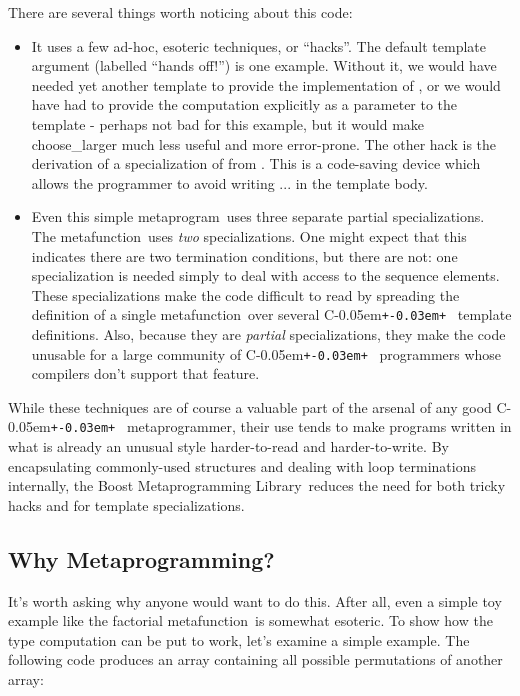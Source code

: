 \documentclass{kapproc}
\newcommand{\Cpp}{C\kern-0.05em\texttt{+\kern-0.03em+}%
}
\newcommand{\Mpl}{Boost Meta\-pro\-gram\-ming Library}
\newcommand{\mpgm}{meta\-pro\-gram}
\newcommand{\mpgmer}{meta\-pro\-gram\-mer}
\newcommand{\mfn}{meta\-func\-tion}
\begin{document}
There are several things worth noticing about this code:

\begin{itemize}
\item It uses a few ad-hoc, esoteric techniques, or ``hacks''. The
  default template argument  (labelled ``hands off!'')
  is one example. Without it, we would have needed yet another
  template to provide the implementation of ,
  or we would have had to provide the computation explicitly as a
  parameter to the template - perhaps not bad for this example, but it
  would make choose\_\-larger much less useful and more
  error-prone. The other hack is the derivation of a specialization of
   from . This is a code-saving
  device which allows the programmer to avoid writing ... in the template body.

\item Even this simple \mpgm\ uses three separate partial
  specializations. The  \mfn\ uses \emph{two}
  specializations. One might expect that this indicates there are two
  termination conditions, but there are not: one specialization is
  needed simply to deal with access to the sequence elements. These
  specializations make the code difficult to read by spreading the
  definition of a single \mfn\ over several \Cpp\ template
  definitions. Also, because they are \emph{partial} specializations,
  they make the code unusable for a large community of \Cpp\
  programmers whose compilers don't support that feature.
\end{itemize}

While these techniques are of course a valuable part of the arsenal of
any good \Cpp\ \mpgmer, their use tends to make programs written in
what is already an unusual style harder-to-read and
harder-to-write. By encapsulating commonly-used structures and dealing
with loop terminations internally, the \Mpl\ reduces the need for both
tricky hacks and for template specializations.

\subsection{Why Metaprogramming?}


It's worth asking why anyone would want to do this. After all, even a
simple toy example like the factorial \mfn\ is somewhat
esoteric. To show how the type computation can be put to work, let's
examine a simple example. The following code produces an array
containing all possible permutations of another array:
\end{document}
